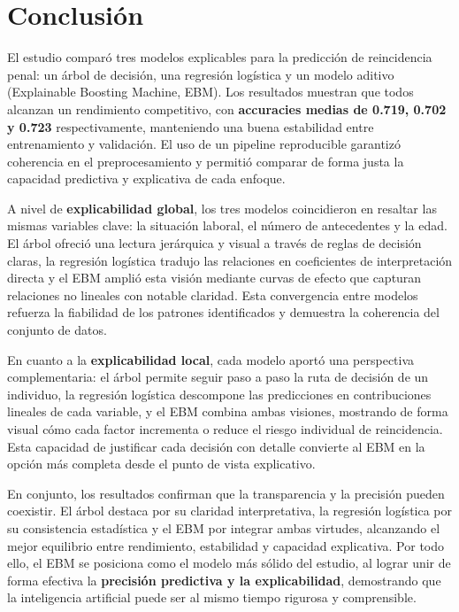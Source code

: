 \section{Conclusión}

El estudio comparó tres modelos explicables para la predicción de reincidencia penal: un árbol de decisión, una regresión logística y un modelo aditivo (Explainable Boosting Machine, EBM). 
Los resultados muestran que todos alcanzan un rendimiento competitivo, con \textbf{accuracies medias de 0.719, 0.702 y 0.723} respectivamente, manteniendo una buena estabilidad entre entrenamiento y validación. 
El uso de un pipeline reproducible garantizó coherencia en el preprocesamiento y permitió comparar de forma justa la capacidad predictiva y explicativa de cada enfoque.

A nivel de \textbf{explicabilidad global}, los tres modelos coincidieron en resaltar las mismas variables clave: la situación laboral, el número de antecedentes y la edad. 
El árbol ofreció una lectura jerárquica y visual a través de reglas de decisión claras, la regresión logística tradujo las relaciones en coeficientes de interpretación directa y el EBM amplió esta visión mediante curvas de efecto que capturan relaciones no lineales con notable claridad. 
Esta convergencia entre modelos refuerza la fiabilidad de los patrones identificados y demuestra la coherencia del conjunto de datos.

En cuanto a la \textbf{explicabilidad local}, cada modelo aportó una perspectiva complementaria: el árbol permite seguir paso a paso la ruta de decisión de un individuo, la regresión logística descompone las predicciones en contribuciones lineales de cada variable, y el EBM combina ambas visiones, mostrando de forma visual cómo cada factor incrementa o reduce el riesgo individual de reincidencia. 
Esta capacidad de justificar cada decisión con detalle convierte al EBM en la opción más completa desde el punto de vista explicativo.

En conjunto, los resultados confirman que la transparencia y la precisión pueden coexistir. 
El árbol destaca por su claridad interpretativa, la regresión logística por su consistencia estadística y el EBM por integrar ambas virtudes, alcanzando el mejor equilibrio entre rendimiento, estabilidad y capacidad explicativa. 
Por todo ello, el EBM se posiciona como el modelo más sólido del estudio, al lograr unir de forma efectiva la \textbf{precisión predictiva y la explicabilidad}, demostrando que la inteligencia artificial puede ser al mismo tiempo rigurosa y comprensible.

